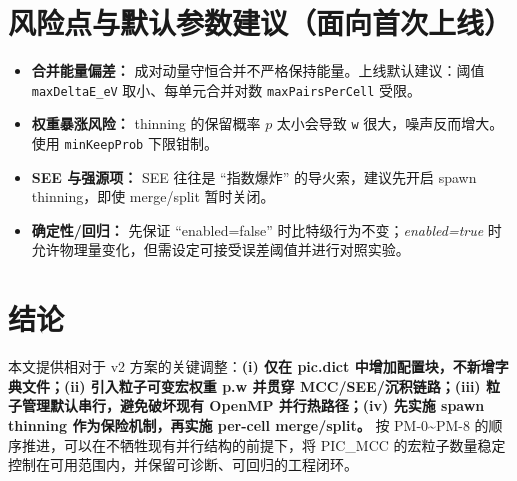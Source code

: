 \documentclass[UTF8,11pt,a4paper]{ctexart}
\begin{document}
\section{风险点与默认参数建议（面向首次上线）}
\begin{itemize}[itemsep=3pt]
  \item \textbf{合并能量偏差：} 成对动量守恒合并不严格保持能量。上线默认建议：阈值 \texttt{maxDeltaE\_eV} 取小、每单元合并对数 \texttt{maxPairsPerCell} 受限。
  \item \textbf{权重暴涨风险：} thinning 的保留概率 $p$ 太小会导致 \texttt{w} 很大，噪声反而增大。使用 \texttt{minKeepProb} 下限钳制。
  \item \textbf{SEE 与强源项：} SEE 往往是 ``指数爆炸'' 的导火索，建议先开启 spawn thinning，即使 merge/split 暂时关闭。
  \item \textbf{确定性/回归：} 先保证 ``enabled=false'' 时比特级行为不变；\emph{enabled=true} 时允许物理量变化，但需设定可接受误差阈值并进行对照实验。
\end{itemize}

\section{结论}
本文提供相对于 v2 方案的关键调整：\textbf{(i) 仅在 pic.dict 中增加配置块，不新增字典文件；(ii) 引入粒子可变宏权重 p.w 并贯穿 MCC/SEE/沉积链路；(iii) 粒子管理默认串行，避免破坏现有 OpenMP 并行热路径；(iv) 先实施 spawn thinning 作为保险机制，再实施 per-cell merge/split。}
按 PM-0\textasciitilde PM-8 的顺序推进，可以在不牺牲现有并行结构的前提下，将 PIC\_MCC 的宏粒子数量稳定控制在可用范围内，并保留可诊断、可回归的工程闭环。
\end{document}
